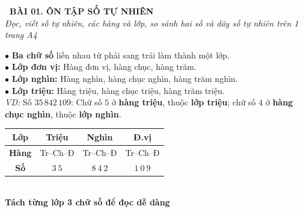 \documentclass[14pt,a4paper,oneside]{extbook}
\begin{document}
\noindent
\begin{tcolorbox}[
  enhanced,
  colback=teal!8!white,
  colframe=teal!80!black,
  arc=3mm,
  boxrule=1.1pt,
  width=\linewidth,
  halign=center,
  top=2.2mm, bottom=2.2mm,
  left=3mm, right=3mm,
  drop fuzzy shadow
]
  {\large\bfseries\color{teal!95!black}\faBookmark\ BÀI 01. ÔN TẬP SỐ TỰ NHIÊN}\\[2pt]
  {\scriptsize\color{black!75}\itshape Đọc, viết số tự nhiên, các hàng và lớp, so sánh hai số và dãy số tự nhiên trên 1 trang A4}
\end{tcolorbox}

\vspace{3.2mm}
\noindent
\begin{minipage}[t]{0.60\textwidth}
  \begin{tcolorbox}[
    enhanced,
    title={\footnotesize\bfseries\color{white}\faKey\ 1. Hàng và lớp của số tự nhiên},
    colback=blue!2!white,
    colframe=blue!75!black,
    arc=2.5mm, boxrule=0.8pt, top=1.8mm, bottom=1.8mm, left=2.2mm, right=2.2mm
  ]
    \footnotesize
    $\bullet$ \textbf{Ba chữ số} liền nhau từ phải sang trái làm thành một lớp.\\
    $\bullet$ \textbf{Lớp đơn vị:} Hàng đơn vị, hàng chục, hàng trăm.\\
    $\bullet$ \textbf{Lớp nghìn:} Hàng nghìn, hàng chục nghìn, hàng trăm nghìn.\\
    $\bullet$ \textbf{Lớp triệu:} Hàng triệu, hàng chục triệu, hàng trăm triệu.\\[1.5pt]
    \textit{VD:} Số $35\,842\,109$: Chữ số $5$ ở \textbf{hàng triệu}, thuộc \textbf{lớp triệu}; chữ số $4$ ở \textbf{hàng chục nghìn}, thuộc \textbf{lớp nghìn}.
  \end{tcolorbox}
\end{minipage}%
\hfill
\begin{minipage}[t]{0.38\textwidth}
  \begin{tcolorbox}[
    enhanced,
    title={\footnotesize\bfseries\color{white}\faEye\ Bảng cấu tạo số},
    colback=teal!2!white,
    colframe=teal!75!black,
    arc=2.5mm, boxrule=0.8pt, top=1.8mm, bottom=1.8mm, left=1.5mm, right=1.5mm,
    halign=center
  ]
    \scriptsize
    \begin{tabular}{|c|c|c|c|}
      \hline
      \textbf{Lớp} & Triệu & Nghìn & Đ.vị \\ \hline
      \textbf{Hàng} & Tr--Ch--Đ & Tr--Ch--Đ & Tr--Ch--Đ \\ \hline
      \textbf{Số} & $3\ 5$ & $8\ 4\ 2$ & $1\ 0\ 9$ \\ \hline
    \end{tabular}\\[3pt]
    {\tiny\color{teal!90!black}\bfseries Tách từng lớp 3 chữ số để đọc dễ dàng}
  \end{tcolorbox}
\end{minipage}
\end{document}
